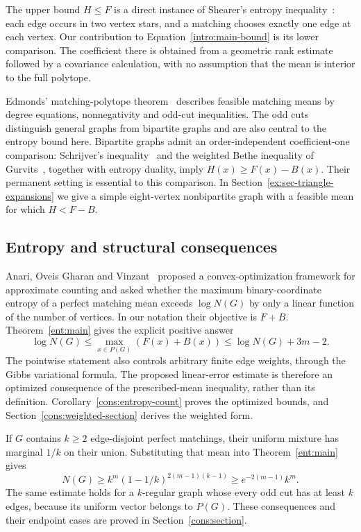 The upper bound $H\le F$ is a direct instance of Shearer's entropy
inequality~\citep{ChungGrahamFranklShearer1986}: each edge occurs in
two vertex stars, and a matching chooses exactly one edge at each
vertex. Our contribution to Equation~\eqref{intro:main-bound} is its
lower comparison. The coefficient there is obtained from a geometric
rank estimate followed by a covariance calculation, with no assumption
that the mean is interior to the full polytope.

Edmonds' matching-polytope theorem~\citep{Edmonds1965} describes feasible
matching means by degree equations, nonnegativity and odd-cut
inequalities. The odd cuts distinguish general graphs from bipartite
graphs and are also central to the entropy bound here. Bipartite graphs
admit an order-independent coefficient-one comparison:
Schrijver's inequality~\citep{Schrijver1998Counting} and the weighted Bethe
inequality of Gurvits~\citep[expanded version, Theorem~2.2]{Gurvits2011SchrijverBethe}, together with
entropy duality, imply $H(x)\ge F(x)-B(x)$. Their permanent setting is
essential to this comparison. In Section~\ref{ex:sec-triangle-expansions} we give a
simple eight-vertex nonbipartite graph with a feasible mean for which
$H<F-B$.

\subsection{Entropy and structural consequences}

Anari, Oveis Gharan and Vinzant~\citep[FOCS version, Conjecture~6]{AnariOveisGharanVinzant2018}
proposed a convex-optimization framework for approximate counting
and asked whether the maximum binary-coordinate entropy of a perfect
matching mean exceeds $\log N(G)$ by only a linear function of the
number of vertices. In our notation their objective is $F+B$.
Theorem~\ref{ent:main} gives the explicit positive answer
\[
 \log N(G)\le\max_{x\in P(G)}(F(x)+B(x))
                       \le\log N(G)+3m-2.
\]
The pointwise statement also controls arbitrary finite edge weights,
through the Gibbs variational formula. The proposed linear-error
estimate is therefore an optimized consequence of the prescribed-mean
inequality, rather than its definition. Corollary~\ref{cons:entropy-count} proves the optimized bounds, and
Section~\ref{cons:weighted-section} derives the weighted form.

If $G$ contains $k\ge2$ edge-disjoint perfect matchings, their uniform
mixture has marginal $1/k$ on their union. Substituting that mean into
Theorem~\ref{ent:main} gives
\[
 N(G)\ge k^m(1-1/k)^{2(m-1)(k-1)}
       \ge e^{-2(m-1)}k^m.
\]
The same estimate holds for a $k$-regular graph whose every odd cut has
at least $k$ edges, because its uniform vector belongs to $P(G)$.
These consequences and their endpoint cases are proved in
Section~\ref{cons:section}.

